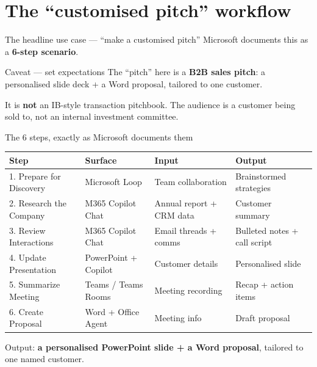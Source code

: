 \documentclass[11pt,aspectratio=169]{beamer}
\newcommand{\hl}[1]{\textbf{\textcolor{accentteal}{#1}}}
\begin{document}
\section{The ``customised pitch'' workflow}

\begin{frame}{The headline use case --- ``make a customised pitch''}
  Microsoft documents this as a \hl{6-step scenario}.

  \medskip
  \begin{exampleblock}{Caveat --- set expectations}
    The ``pitch'' here is a \hl{B2B sales pitch}: a personalised slide deck + a Word proposal, tailored to one customer.

    \medskip
    It is \hl{not} an IB-style transaction pitchbook. The audience is a customer being sold to, not an internal investment committee.
  \end{exampleblock}
\end{frame}

\begin{frame}{The 6 steps, exactly as Microsoft documents them}
  \centering\footnotesize
  \begin{tabular}{lll>{\raggedright\arraybackslash}p{}}
    \toprule
    \textbf{Step} & \textbf{Surface} & \textbf{Input} & \textbf{Output} \\
    \midrule
    1. Prepare for Discovery   & Microsoft Loop & Team collaboration & Brainstormed strategies \\
    2. Research the Company    & M365 Copilot Chat & Annual report + CRM data & Customer summary \\
    3. Review Interactions     & M365 Copilot Chat & Email threads + comms & Bulleted notes + call script \\
    4. Update Presentation     & PowerPoint + Copilot & Customer details & Personalised slide \\
    5. Summarize Meeting       & Teams / Teams Rooms & Meeting recording & Recap + action items \\
    6. Create Proposal         & Word + Office Agent & Meeting info & Draft proposal \\
    \bottomrule
  \end{tabular}

  \vfill
  \raggedright Output: \hl{a personalised PowerPoint slide + a Word proposal}, tailored to one named customer.
\end{frame}
\end{document}
